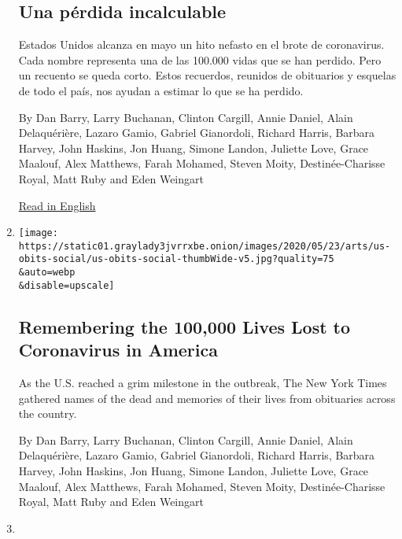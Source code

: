 \begin{enumerate}
  \hypertarget{una-puxe9rdida-incalculable}{%
  \subsection{Una pérdida
  incalculable}\label{una-puxe9rdida-incalculable}}

  Estados Unidos alcanza en mayo un hito nefasto en el brote de
  coronavirus. Cada nombre representa una de las 100.000 vidas que se
  han perdido. Pero un recuento se queda corto. Estos recuerdos,
  reunidos de obituarios y esquelas de todo el país, nos ayudan a
  estimar lo que se ha perdido.

  By Dan Barry, Larry Buchanan, Clinton Cargill, Annie Daniel, Alain
  Delaquérière, Lazaro Gamio, Gabriel Gianordoli, Richard Harris,
  Barbara Harvey, John Haskins, Jon Huang, Simone Landon, Juliette Love,
  Grace Maalouf, Alex Matthews, Farah Mohamed, Steven Moity,
  Destinée-Charisse Royal, Matt Ruby and Eden Weingart

  \href{https://www.nytimes3xbfgragh.onion/interactive/2020/05/24/us/us-coronavirus-deaths-100000.html}{Read
  in English}
\item
  \href{/interactive/2020/05/24/us/us-coronavirus-deaths-100000.html}{}

  \texttt{[image: https://static01.graylady3jvrrxbe.onion/images/2020/05/23/arts/us-obits-social/us-obits-social-thumbWide-v5.jpg?quality=75\\\&auto=webp\\\&disable=upscale]}

  \hypertarget{remembering-the-100000-lives-lost-to-coronavirus-in-america}{%
  \subsection{Remembering the 100,000 Lives Lost to Coronavirus in
  America}\label{remembering-the-100000-lives-lost-to-coronavirus-in-america}}

  As the U.S. reached a grim milestone in the outbreak, The New York
  Times gathered names of the dead and memories of their lives from
  obituaries across the country.

  By Dan Barry, Larry Buchanan, Clinton Cargill, Annie Daniel, Alain
  Delaquérière, Lazaro Gamio, Gabriel Gianordoli, Richard Harris,
  Barbara Harvey, John Haskins, Jon Huang, Simone Landon, Juliette Love,
  Grace Maalouf, Alex Matthews, Farah Mohamed, Steven Moity,
  Destinée-Charisse Royal, Matt Ruby and Eden Weingart
\item
  \href{/interactive/2020/05/12/us/coronavirus-reopening-shutdown.html}{}


\end{enumerate}
